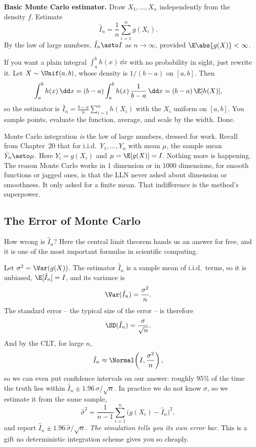 \begin{formalbox}
\textbf{Basic Monte Carlo estimator.} Draw $X_1,\dots,X_n$ independently from the
density $f$. Estimate
\[
  \hat I_n = \frac1n \sum_{i=1}^n g(X_i).
\]
By the law of large numbers, $\hat I_n \asto I$ as $n\to\infty$, provided
$\E\abs{g(X)} < \infty$.
\end{formalbox}

If you want a plain integral $\int_a^b h(x)\,\dd x$ with no probability in sight,
just rewrite it. Let $X\sim\Unif(a,b)$, whose density is $1/(b-a)$ on $[a,b]$.
Then
\[
  \int_a^b h(x)\,\dd x = (b-a)\int_a^b h(x)\,\frac{1}{b-a}\,\dd x
  = (b-a)\,\E[h(X)],
\]
so the estimator is $\hat I_n = \frac{b-a}{n}\sum_{i=1}^n h(X_i)$ with the
$X_i$ uniform on $[a,b]$. You sample points, evaluate the function, average, and
scale by the width. Done.

\begin{connectionbox}
Monte Carlo integration \emph{is} the law of large numbers, dressed for work.
Recall from Chapter~20 that for i.i.d.\ $Y_1,\dots,Y_n$ with mean $\mu$, the
sample mean $\bar Y_n \asto \mu$. Here $Y_i = g(X_i)$ and $\mu = \E[g(X)] = I$.
Nothing more is happening. The reason Monte Carlo works in $1$ dimension or in
$1000$ dimensions, for smooth functions or jagged ones, is that the LLN never
asked about dimension or smoothness. It only asked for a finite mean. That
indifference is the method's superpower.
\end{connectionbox}

\subsection{The Error of Monte Carlo}
\label{ch35:error}

How wrong is $\hat I_n$? Here the central limit theorem hands us an answer for
free, and it is one of the most important formulas in scientific computing.

Let $\sigma^2 = \Var(g(X))$. The estimator $\hat I_n$ is a sample mean of i.i.d.\
terms, so it is unbiased, $\E[\hat I_n] = I$, and its variance is
\[
  \Var(\hat I_n) = \frac{\sigma^2}{n}.
\]
The standard error -- the typical size of the error -- is therefore
\[
  \SD(\hat I_n) = \frac{\sigma}{\sqrt n}.
\]
And by the CLT, for large $n$,
\[
  \hat I_n \approx \Normal\!\left(I, \frac{\sigma^2}{n}\right),
\]
so we can even put confidence intervals on our answer: roughly $95\%$ of the time
the truth lies within $\hat I_n \pm 1.96\,\sigma/\sqrt n$. In practice we do not
know $\sigma$, so we estimate it from the same sample,
\[
  \hat\sigma^2 = \frac{1}{n-1}\sum_{i=1}^n \bigl(g(X_i) - \hat I_n\bigr)^2,
\]
and report $\hat I_n \pm 1.96\,\hat\sigma/\sqrt n$. \emph{The simulation tells
you its own error bar.} This is a gift no deterministic integration scheme gives
you so cheaply.

